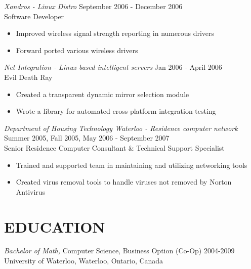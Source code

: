 \documentclass[10pt,line,margin=0.1]{newsres}
\begin{document}
\begin{resume}
        {\sl Xandros - Linux Distro} \hfill September 2006 - December 2006 \\
        Software Developer
        \begin{itemize}  \itemsep -2pt %
        \item{Improved wireless signal strength reporting in numerous drivers}
        \item{Forward ported various wireless drivers}
        \end{itemize}
        {\sl Net Integration - Linux based intelligent servers} \hfill Jan 2006 - April 2006 \\
        Evil Death Ray
        \begin{itemize}  \itemsep -2pt %
        \item{Created a transparent dynamic mirror selection module}
        \item{Wrote a library for automated cross-platform integration testing}
        \end{itemize}
        {\sl Department of Housing Technology Waterloo - Residence computer network} \hfill Summer 2005, Fall 2005, May 2006 - September 2007 \\
        Senior Residence Computer Consultant \& Technical Support Specialist
        \begin{itemize} \itemsep -2pt %
        \item{Trained and supported team in maintaining and utilizing networking tools}
        \item{Created virus removal tools to handle viruses not removed by Norton Antivirus}
        \end{itemize}

 \section{EDUCATION} {\sl Bachelor of Math,} Computer Science, Business Option (Co-Op) 2004-2009 \\
                University of Waterloo, Waterloo, Ontario, Canada
\end{resume}
\end{document}
